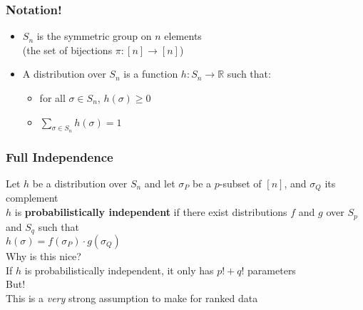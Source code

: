 \documentclass{beamer} %
\theoremstyle{definition} %
\def \pausenl {\pause $ \ $\\}
\begin{document}
\begin{frame}
	\frametitle{Notation!}
	
	\pause
	\begin{itemize}
		\item[] $S_n$ is the symmetric group on $n$ elements \\(the set of bijections $\pi : [n]\rightarrow [n]$)
		\pause
		\item[] A distribution over $S_n$ is a function $h:S_n\rightarrow \mathbb{R}$ such that:\\
		
		\begin{itemize}	
			\item for all $\sigma\in S_n$, $h(\sigma)\geq 0$
			\item $\sum\limits_{\sigma\in S_n}h(\sigma) = 1$
			\end{itemize}
			
	
	\end{itemize}
	
	
\end{frame}
\begin{frame}
	\frametitle{Full Independence}
	
	
	Let $h$ be a distribution over $S_n$ and let $\sigma_P$ be a $p$-subset of $[n]$, and $\sigma_Q$ its complement\\
	
	\pausenl
	$h$ is \textbf{probabilistically independent} if there exist distributions $f$ and $g$ over $S_p$ and $S_q$ such that\\
	$h(\sigma)  = f(\sigma_P)\cdot g(\sigma_Q)$\\
	
	\pausenl
	Why is this nice?\\
	\pause
	If $h$ is probabilistically independent, it only has $p! + q!$ parameters\\
	\pausenl
	But!\\
	\pause
	This is a \textit{very} strong assumption to make for ranked data
	
\end{frame}
\end{document}
